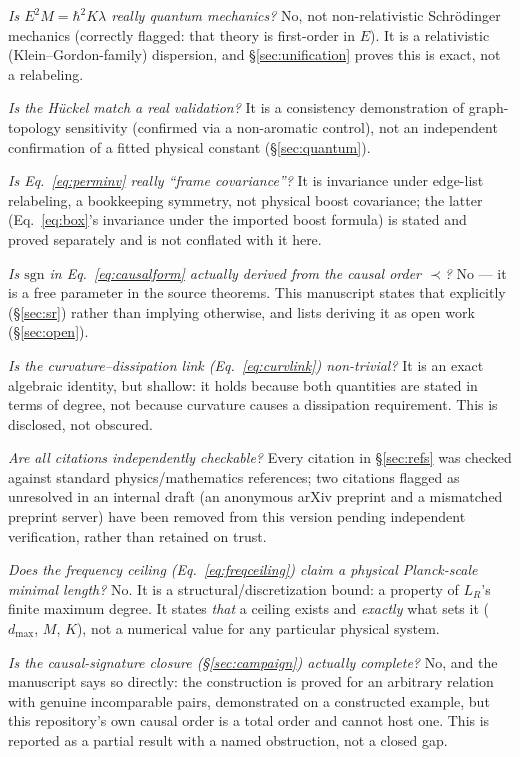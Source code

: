\documentclass[10pt,twocolumn]{article}
\begin{document}
\noindent\textit{Is $E^2M=\hbar^2K\lambda$ really quantum mechanics?} No, not
non-relativistic Schr\"odinger mechanics (correctly flagged: that theory is
first-order in $E$). It is a relativistic (Klein--Gordon-family) dispersion, and
\S\ref{sec:unification} proves this is exact, not a relabeling.

\noindent\textit{Is the H\"uckel match a real validation?} It is a consistency
demonstration of graph-topology sensitivity (confirmed via a non-aromatic control),
not an independent confirmation of a fitted physical constant (\S\ref{sec:quantum}).

\noindent\textit{Is Eq.~\ref{eq:perminv} really ``frame covariance''?} It is
invariance under edge-list relabeling, a bookkeeping symmetry, not physical boost
covariance; the latter (Eq.~\ref{eq:box}'s invariance under the imported boost
formula) is stated and proved separately and is not conflated with it here.

\noindent\textit{Is $\mathrm{sgn}$ in Eq.~\ref{eq:causalform} actually derived from
the causal order $\prec$?} No --- it is a free parameter in the source theorems. This
manuscript states that explicitly (\S\ref{sec:sr}) rather than implying otherwise, and
lists deriving it as open work (\S\ref{sec:open}).

\noindent\textit{Is the curvature--dissipation link (Eq.~\ref{eq:curvlink})
non-trivial?} It is an exact algebraic identity, but shallow: it holds because both
quantities are stated in terms of degree, not because curvature causes a dissipation
requirement. This is disclosed, not obscured.

\noindent\textit{Are all citations independently checkable?} Every citation in
\S\ref{sec:refs} was checked against standard physics/mathematics references; two
citations flagged as unresolved in an internal draft (an anonymous arXiv preprint and
a mismatched preprint server) have been removed from this version pending independent
verification, rather than retained on trust.

\noindent\textit{Does the frequency ceiling (Eq.~\ref{eq:freqceiling}) claim a
physical Planck-scale minimal length?} No. It is a structural/discretization bound: a
property of $L_R$'s finite maximum degree. It states \emph{that} a ceiling exists and
\emph{exactly} what sets it ($d_{\max}$, $M$, $K$), not a numerical value for any
particular physical system.

\noindent\textit{Is the causal-signature closure (\S\ref{sec:campaign}) actually
complete?} No, and the manuscript says so directly: the construction is proved for an
arbitrary relation with genuine incomparable pairs, demonstrated on a constructed
example, but this repository's own causal order is a total order and cannot host one.
This is reported as a partial result with a named obstruction, not a closed gap.
\end{document}
